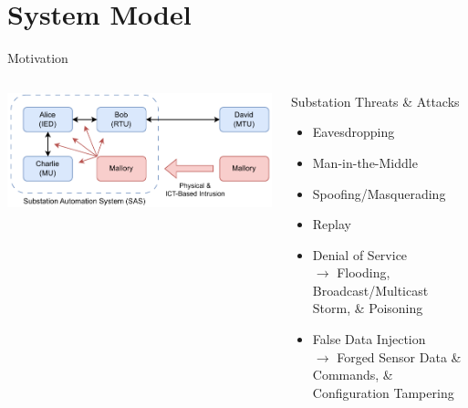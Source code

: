 \documentclass[en]{sdqbeamer}
\begin{document}
\appendix
\beginbackup
\section{System Model}
\begin{frame}{Motivation}
    \begin{columns}
        \centering
        \includegraphics[width=1.0\textwidth]{./figures/sas_intrusion.drawio.pdf}
        \begin{redblock}{Substation Threats \& Attacks}
            \begin{itemize}
                \item Eavesdropping
                \item Man-in-the-Middle
                \item Spoofing/Masquerading
                \item Replay
                \item Denial of Service\\$\rightarrow$ Flooding, Broadcast/Multicast Storm, \& Poisoning
                \item False Data Injection\\$\rightarrow$ Forged Sensor Data \& Commands, \& Configuration Tampering
            \end{itemize}
        \end{redblock}
    \end{columns}
\end{frame}
\end{document}
